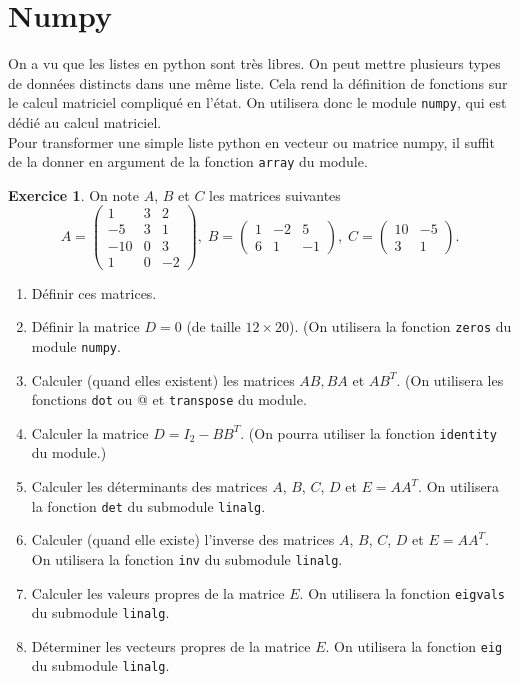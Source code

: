 \documentclass[a4paper,francais,11pt]{article}
\theoremstyle{definition}
\newtheorem{exercice}{Exercice}
\begin{document}


\section{Numpy}

On a vu que les listes en python sont très libres. On peut mettre plusieurs types de données distincts dans une même liste. Cela rend la définition de fonctions sur le calcul matriciel compliqué en l'état. On utilisera donc le module {\tt numpy}, qui est dédié au calcul matriciel.\\

Pour transformer une simple liste python en vecteur ou matrice numpy, il suffit de la donner en argument de la fonction {\tt array} du module.\\

\begin{exercice}
On note $A$, $B$ et $C$ les matrices suivantes
\[A=\begin{pmatrix}1 & 3 & 2 \\ -5 & 3 & 1\\ -10 & 0 & 3\\ 1 & 0 & -2
\end{pmatrix}
,\;
B=\begin{pmatrix}1 & -2 & 5 \\ 6 & 1 & -1
\end{pmatrix}
,\;C=\begin{pmatrix}10 & -5  \\ 3 & 1
\end{pmatrix}
.\]
\begin{enumerate}
\item Définir ces matrices.
\item Définir la matrice  $D = 0$ (de taille $12\times 20$). (On utilisera la fonction {\tt zeros} du module  {\tt numpy}.
\item Calculer (quand elles existent) les matrices $AB, BA$ et $AB^T$. (On utilisera les fonctions  {\tt dot} ou @ et  {\tt transpose} du module.
\item Calculer la matrice $D=I_2-BB^T$. (On pourra utiliser la fonction {\tt identity} du module.)
\item Calculer les déterminants des matrices $A$, $B$, $C$, $D$ et $E= AA^T$. On utilisera la fonction {\tt det} du submodule {\tt linalg}.
\item Calculer (quand elle existe) l'inverse des matrices $A$, $B$, $C$, $D$ et $E= AA^T$. On utilisera la fonction {\tt inv} du submodule {\tt linalg}.
\item Calculer les valeurs propres de la matrice $E$.  On utilisera la fonction {\tt eigvals} du submodule {\tt linalg}.
\item Déterminer les vecteurs propres de la matrice $E$.  On utilisera la fonction {\tt eig} du submodule {\tt linalg}.


\end{enumerate}

\end{exercice}
\end{document}
